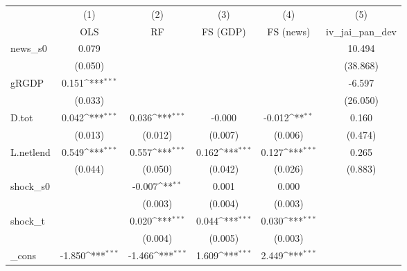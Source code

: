 {
\def\sym#1{\ifmmode^{#1}\else\(^{#1}\)\fi}
\begin{tabular}{l*{5}{c}}
\toprule
            &\multicolumn{1}{c}{(1)}&\multicolumn{1}{c}{(2)}&\multicolumn{1}{c}{(3)}&\multicolumn{1}{c}{(4)}&\multicolumn{1}{c}{(5)}\\
            &\multicolumn{1}{c}{OLS}&\multicolumn{1}{c}{RF}&\multicolumn{1}{c}{FS (GDP)}&\multicolumn{1}{c}{FS (news)}&\multicolumn{1}{c}{iv\_jai\_pan\_dev}\\
\midrule
news\_s0     &       0.079         &                     &                     &                     &      10.494         \\
            &     (0.050)         &                     &                     &                     &    (38.868)         \\
\addlinespace
gRGDP       &       0.151\sym{***}&                     &                     &                     &      -6.597         \\
            &     (0.033)         &                     &                     &                     &    (26.050)         \\
\addlinespace
D.tot       &       0.042\sym{***}&       0.036\sym{***}&      -0.000         &      -0.012\sym{**} &       0.160         \\
            &     (0.013)         &     (0.012)         &     (0.007)         &     (0.006)         &     (0.474)         \\
\addlinespace
L.netlend   &       0.549\sym{***}&       0.557\sym{***}&       0.162\sym{***}&       0.127\sym{***}&       0.265         \\
            &     (0.044)         &     (0.050)         &     (0.042)         &     (0.026)         &     (0.883)         \\
\addlinespace
shock\_s0    &                     &      -0.007\sym{**} &       0.001         &       0.000         &                     \\
            &                     &     (0.003)         &     (0.004)         &     (0.003)         &                     \\
\addlinespace
shock\_t     &                     &       0.020\sym{***}&       0.044\sym{***}&       0.030\sym{***}&                     \\
            &                     &     (0.004)         &     (0.005)         &     (0.003)         &                     \\
\addlinespace
\_cons      &      -1.850\sym{***}&      -1.466\sym{***}&       1.609\sym{***}&       2.449\sym{***}&                     \\

\end{tabular}}

